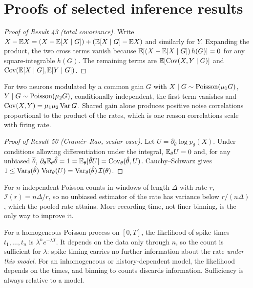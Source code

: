 \section{Proofs of selected inference results}
\begin{proof}[Proof of Result 43 (total covariance)]
Write $X-\mathbb{E} X=(X-\mathbb{E}[X\mid G])+(\mathbb{E}[X\mid G]-\mathbb{E} X)$ and similarly for $Y$.
Expanding the product, the two cross terms vanish because
$\mathbb{E}[(X-\mathbb{E}[X\mid G])\,h(G)]=0$ for any square-integrable $h(G)$. The
remaining terms are $\mathbb{E}[\operatorname{Cov}(X,Y\mid G)]$ and
$\operatorname{Cov}(\mathbb{E}[X\mid G],\mathbb{E}[Y\mid G])$.
\end{proof}
For two neurons modulated by a common gain $G$ with
$X\mid G\sim\operatorname{Poisson}(\mu_1G)$, $Y\mid G\sim\operatorname{Poisson}(\mu_2G)$, conditionally
independent, the first term vanishes and $\operatorname{Cov}(X,Y)=\mu_1\mu_2\operatorname{Var} G$.
Shared gain alone produces positive noise correlations proportional to
the product of the rates, which is one reason correlations scale with
firing rate.

\begin{proof}[Proof of Result 50 (Cram\'er--Rao, scalar case)]
Let $U=\partial_\theta\log p_\theta(X)$. Under conditions allowing
differentiation under the integral, $\mathbb{E}_\theta U=0$ and, for any unbiased
$\hat\theta$, $\partial_\theta\mathbb{E}_\theta\hat\theta=1=\mathbb{E}_\theta[\hat\theta U]
=\operatorname{Cov}_\theta(\hat\theta,U)$. Cauchy--Schwarz gives
$1\le\operatorname{Var}_\theta(\hat\theta)\,\operatorname{Var}_\theta(U)=\operatorname{Var}_\theta(\hat\theta)\,\mathcal I(\theta)$.
\end{proof}
For $n$ independent Poisson counts in windows of length $\Delta$ with
rate $r$, $\mathcal I(r)=n\Delta/r$, so no unbiased estimator of the rate
has variance below $r/(n\Delta)$, which the pooled rate attains. More
recording time, not finer binning, is the only way to improve it.

\begin{example}
For a homogeneous Poisson process on $[0,T]$, the likelihood of spike
times $t_1,\ldots,t_n$ is $\lambda^ne^{-\lambda T}$. It depends on the
data only through $n$, so the count is sufficient for $\lambda$: spike
timing carries no further information about the rate \emph{under this
model}. For an inhomogeneous or history-dependent model, the likelihood
depends on the times, and binning to counts discards information.
Sufficiency is always relative to a model.
\end{example}

